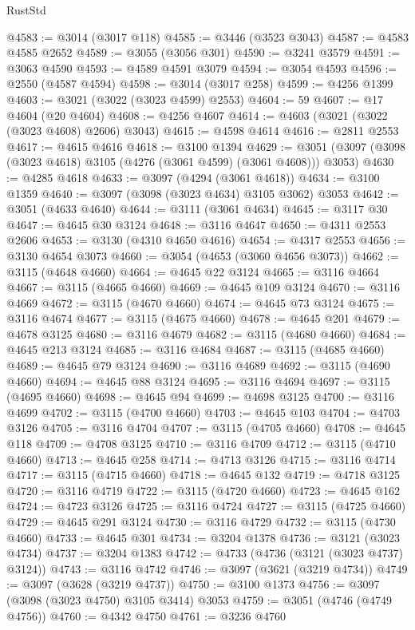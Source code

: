 \begin{lexlean}{RustStd}
\begin{coremodule}
@4583 := @3014 (@3017 @118)
@4585 := @3446 (@3523 @3043)
@4587 := @4583 @4585 @2652
@4589 := @3055 (@3056 @301)
@4590 := @3241 @3579
@4591 := @3063 @4590
@4593 := @4589 @4591 @3079
@4594 := @3054 @4593
@4596 := @2550 (@4587 @4594)
@4598 := @3014 (@3017 @258)
@4599 := @4256 @1399
@4603 := @3021 (@3022 (@3023 @4599) @2553)
@4604 := 59
@4607 := @17 @4604 (@20 @4604)
@4608 := @4256 @4607
@4614 := @4603 (@3021 (@3022 (@3023 @4608) @2606) @3043)
@4615 := @4598 @4614
@4616 := @2811 @2553
@4617 := @4615 @4616
@4618 := @3100 @1394
@4629 := @3051 (@3097 (@3098 (@3023 @4618) @3105 (@4276 (@3061 @4599) (@3061 @4608))) @3053)
@4630 := @4285 @4618
@4633 := @3097 (@4294 (@3061 @4618))
@4634 := @3100 @1359
@4640 := @3097 (@3098 (@3023 @4634) @3105 @3062) @3053
@4642 := @3051 (@4633 @4640)
@4644 := @3111 (@3061 @4634)
@4645 := @3117 @30
@4647 := @4645 @30 @3124
@4648 := @3116 @4647
@4650 := @4311 @2553 @2606
@4653 := @3130 (@4310 @4650 @4616)
@4654 := @4317 @2553
@4656 := @3130 @4654 @3073
@4660 := @3054 (@4653 (@3060 @4656 @3073))
@4662 := @3115 (@4648 @4660)
@4664 := @4645 @22 @3124
@4665 := @3116 @4664
@4667 := @3115 (@4665 @4660)
@4669 := @4645 @109 @3124
@4670 := @3116 @4669
@4672 := @3115 (@4670 @4660)
@4674 := @4645 @73 @3124
@4675 := @3116 @4674
@4677 := @3115 (@4675 @4660)
@4678 := @4645 @201
@4679 := @4678 @3125
@4680 := @3116 @4679
@4682 := @3115 (@4680 @4660)
@4684 := @4645 @213 @3124
@4685 := @3116 @4684
@4687 := @3115 (@4685 @4660)
@4689 := @4645 @79 @3124
@4690 := @3116 @4689
@4692 := @3115 (@4690 @4660)
@4694 := @4645 @88 @3124
@4695 := @3116 @4694
@4697 := @3115 (@4695 @4660)
@4698 := @4645 @94
@4699 := @4698 @3125
@4700 := @3116 @4699
@4702 := @3115 (@4700 @4660)
@4703 := @4645 @103
@4704 := @4703 @3126
@4705 := @3116 @4704
@4707 := @3115 (@4705 @4660)
@4708 := @4645 @118
@4709 := @4708 @3125
@4710 := @3116 @4709
@4712 := @3115 (@4710 @4660)
@4713 := @4645 @258
@4714 := @4713 @3126
@4715 := @3116 @4714
@4717 := @3115 (@4715 @4660)
@4718 := @4645 @132
@4719 := @4718 @3125
@4720 := @3116 @4719
@4722 := @3115 (@4720 @4660)
@4723 := @4645 @162
@4724 := @4723 @3126
@4725 := @3116 @4724
@4727 := @3115 (@4725 @4660)
@4729 := @4645 @291 @3124
@4730 := @3116 @4729
@4732 := @3115 (@4730 @4660)
@4733 := @4645 @301
@4734 := @3204 @1378
@4736 := @3121 (@3023 @4734)
@4737 := @3204 @1383
@4742 := @4733 (@4736 (@3121 (@3023 @4737) @3124))
@4743 := @3116 @4742
@4746 := @3097 (@3621 (@3219 @4734))
@4749 := @3097 (@3628 (@3219 @4737))
@4750 := @3100 @1373
@4756 := @3097 (@3098 (@3023 @4750) @3105 @3414) @3053
@4759 := @3051 (@4746 (@4749 @4756))
@4760 := @4342 @4750
@4761 := @3236 @4760

\end{coremodule}
\end{lexlean}
